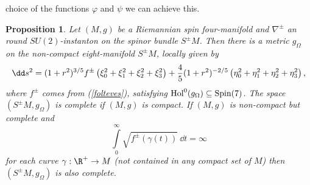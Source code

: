 \documentclass[a4paper,12pt,draft]{article}
\newtheorem{proposition}[theorem]{Proposition}
\begin{document}
choice of the functions $\varphi$ and $\psi$ we can achieve this. 
\begin{proposition}
Let $(M,g)$ be a Riemannian spin four-manifold and $\nabla^\pm$ an
round $SU(2)$-instanton on the spinor bundle
$S^\pm M$. Then there is a metric $g_\Omega$ on the non-compact
eight-manifold $S^\pm M$, locally given by
\begin{equation} 
\dd s^2= (1+r^2)^{3/5}f^\pm\left(\xi_0^2+\xi_1^2+\xi_2^2+\xi_3^2\right)+
{4\over 5}(1+r^2)^{-2/5}\left(\eta_0^2 +\eta_1^2 +\eta_2^2
+\eta_3^2\right) ,
\label{spin7metrika}
\end{equation}
where $f^\pm$ comes from {\rm (\ref{folteves})}, satisfying ${\rm
Hol}^0(g_\Omega )\subseteq{\rm Spin}(7)$. The space $(S^\pm M, g_\Omega
)$ is complete if $(M,g)$ is compact. If $(M,g)$ is non-compact but
complete and
\begin{equation}
\int\limits_0^\infty \sqrt{f^\pm (\gamma (t))}\:\dd t=\infty
\label{teljesseg}
\end{equation}
for each curve $\gamma :\R^+\rightarrow M$ (not contained in any compact
set of $M$) then $(S^\pm M, g_\Omega )$ is also complete.  
\end{proposition}
\end{document}
